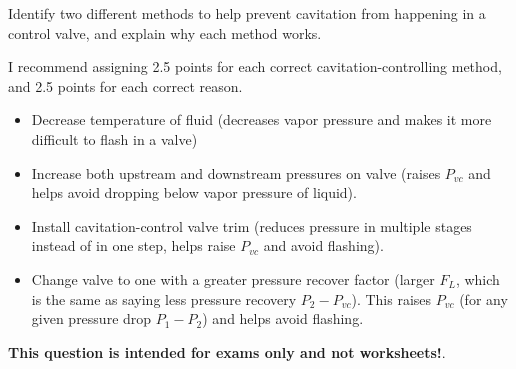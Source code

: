 

Identify two different methods to help prevent cavitation from happening in a control valve, and explain why each method works.

\vskip 100pt







I recommend assigning 2.5 points for each correct cavitation-controlling method, and 2.5 points for each correct reason.

\begin{itemize}
\item{} Decrease temperature of fluid (decreases vapor pressure and makes it more difficult to flash in a valve)
\item{} Increase both upstream and downstream pressures on valve (raises $P_{vc}$ and helps avoid dropping below vapor pressure of liquid).
\item{} Install cavitation-control valve trim (reduces pressure in multiple stages instead of in one step, helps raise $P_{vc}$ and avoid flashing).
\item{} Change valve to one with a greater pressure recover factor (larger $F_L$, which is the same as saying less pressure recovery $P_2 - P_{vc}$).  This raises $P_{vc}$ (for any given pressure drop $P_1 - P_2$) and helps avoid flashing.
\end{itemize}







{\bf This question is intended for exams only and not worksheets!}.



